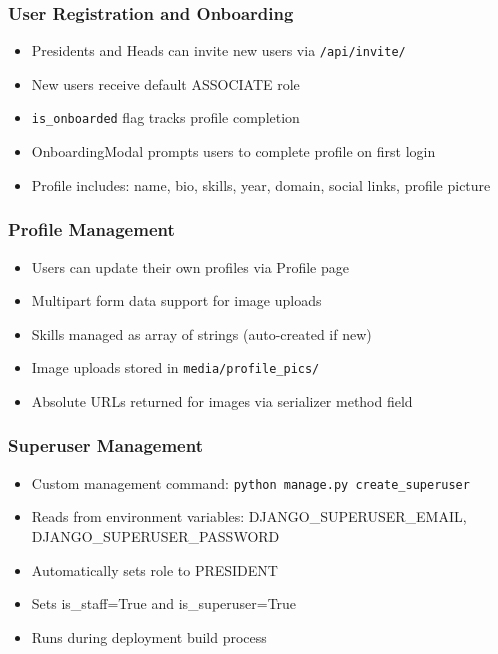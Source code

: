 \documentclass[11pt,a4paper]{article}
\begin{document}
\subsubsection{User Registration and Onboarding}
\begin{itemize}[leftmargin=*]
    \item Presidents and Heads can invite new users via \texttt{/api/invite/}
    \item New users receive default ASSOCIATE role
    \item \texttt{is\_onboarded} flag tracks profile completion
    \item OnboardingModal prompts users to complete profile on first login
    \item Profile includes: name, bio, skills, year, domain, social links, profile picture
\end{itemize}

\subsubsection{Profile Management}
\begin{itemize}[leftmargin=*]
    \item Users can update their own profiles via Profile page
    \item Multipart form data support for image uploads
    \item Skills managed as array of strings (auto-created if new)
    \item Image uploads stored in \texttt{media/profile\_pics/}
    \item Absolute URLs returned for images via serializer method field
\end{itemize}

\subsubsection{Superuser Management}
\begin{itemize}[leftmargin=*]
    \item Custom management command: \texttt{python manage.py create\_superuser}
    \item Reads from environment variables: DJANGO\_SUPERUSER\_EMAIL, DJANGO\_SUPERUSER\_PASSWORD
    \item Automatically sets role to PRESIDENT
    \item Sets is\_staff=True and is\_superuser=True
    \item Runs during deployment build process
\end{itemize}
\end{document}
